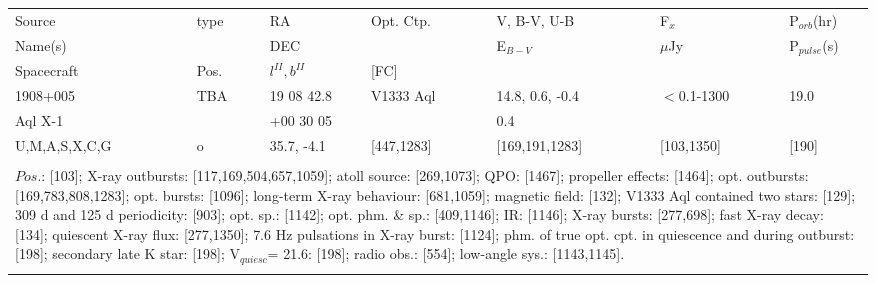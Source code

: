 \documentclass{aa}
\begin{document}
\begin{tabular}{p{2.5cm}p{1cm}p{1.8cm}p{2.3cm}p{3.3cm}p{2.0cm}p{2.2cm}}
\noalign{\smallskip}
\multicolumn{7}{p{17.5cm}}{Table 1.  (continued) }\\        
\hline
\noalign{\smallskip}
Source         & type  & RA                       &  Opt. Ctp. & V, B-V, U-B  & F$_{x}$          & P$_{orb}$(hr)    \\
Name(s)       &            & DEC                    &                     & E$_{B-V}$   & $\mu$Jy        & P$_{pulse}$(s) \\
Spacecraft & Pos.  & $l^{II}, b^{II}$      &  [FC]           &                        &                         &                             \\
\noalign{\smallskip} 
\hline

\noalign{\smallskip}
1908+005             &  TBA            & 19 08 42.8             & V1333 Aql       & 14.8, 0.6, -0.4         & $<$0.1-1300           & 19.0  \\
Aql X-1                 &                       & +00 30 05              &                           & 0.4                            &                                  &      \\
U,M,A,S,X,C,G    & o                   & 35.7, -4.1               & [447,1283]       & [169,191,1283]      & [103,1350]              & [190] \\
\\
\multicolumn{7}{p{17.5cm}}{
$Pos$.: [103]; X-ray outbursts: [117,169,504,657,1059]; atoll source: [269,1073]; QPO: [1467]; propeller effects: [1464]; 
opt. outbursts: [169,783,808,1283]; opt. bursts: [1096]; long-term X-ray behaviour: [681,1059]; magnetic field: [132]; 
V1333 Aql contained two stars: [129]; 309 d and 125 d periodicity: [903]; opt. sp.: [1142]; opt. phm. \& sp.: [409,1146]; 
IR: [1146]; X-ray bursts: [277,698]; fast X-ray decay: [134]; quiescent X-ray flux: [277,1350]; 7.6 Hz pulsations in X-ray 
burst: [1124]; phm. of true opt. cpt. in quiescence and during outburst: [198]; secondary late K star: [198]; 
V$_{quiesc}$= 21.6: [198]; radio obs.: [554]; low-angle sys.: [1143,1145].}\\
\noalign{\smallskip}
\hline


\end{tabular}
\end{document}
